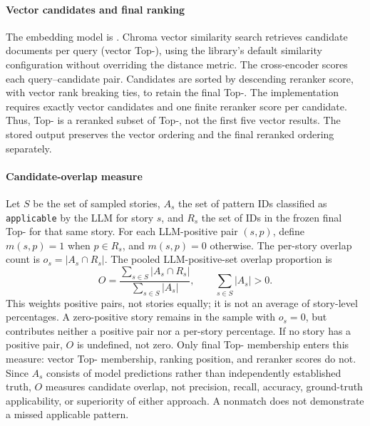 \paragraph{Vector candidates and final ranking}
The embedding model is .
Chroma vector similarity search retrieves \RagVectorCount{} candidate
documents per query (vector Top-\RagVectorCount{}), using the library's default
similarity configuration without overriding the distance metric.
The cross-encoder  scores each query--candidate
pair. Candidates are sorted by descending reranker score, with vector rank
breaking ties, to retain the final Top-\RagFinalCount{}. The implementation
requires exactly \RagVectorCount{} vector candidates and one finite reranker
score per candidate. Thus, Top-\RagFinalCount{} is a reranked subset of
Top-\RagVectorCount{}, not the first five vector results. The stored output
preserves the vector ordering and the final reranked ordering separately.

\paragraph{Candidate-overlap measure}
Let $S$ be the set of sampled stories, $A_s$ the set of pattern IDs classified
as \texttt{applicable} by the LLM for story $s$, and $R_s$ the set of IDs in
the frozen final Top-\RagFinalCount{} for that same story. For each LLM-positive
pair $(s,p)$, define $m(s,p)=1$ when $p \in R_s$, and $m(s,p)=0$ otherwise.
The per-story overlap count is $o_s=|A_s \cap R_s|$. The pooled
LLM-positive-set overlap proportion is
\begin{equation}
  O = \frac{\sum_{s \in S}|A_s \cap R_s|}
           {\sum_{s \in S}|A_s|},
  \qquad \sum_{s \in S}|A_s| > 0.
  \label{eq:rag-overlap}
\end{equation}
This weights positive pairs, not stories equally; it is not an average of
story-level percentages. A zero-positive story remains in the sample with
$o_s=0$, but contributes neither a positive pair nor a per-story percentage.
If no story has a positive pair, $O$ is undefined, not zero.
Only final Top-\RagFinalCount{} membership enters this measure: vector
Top-\RagVectorCount{} membership, ranking position, and reranker scores do not.
Since $A_s$ consists of model predictions rather than independently established
truth, $O$ measures candidate overlap, not precision, recall, accuracy,
ground-truth applicability, or superiority of either approach. A nonmatch
does not demonstrate a missed applicable pattern.


